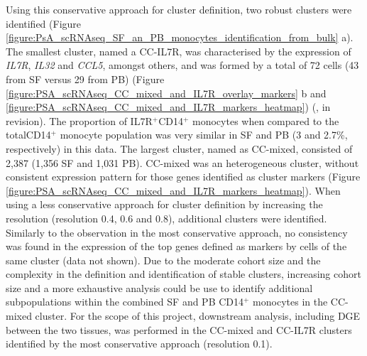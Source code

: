Using this conservative approach for cluster definition, two robust clusters were identified (Figure \ref{figure:PsA_scRNAseq_SF_an_PB_monocytes_identification_from_bulk} a). The smallest cluster, named a CC-IL7R, was characterised by the expression of \textit{IL7R}, \textit{IL32} and \textit{CCL5}, amongst others, and was formed by a total of 72 cells (43 from SF versus 29 from PB) (Figure \ref{figure:PSA_scRNAseq_CC_mixed_and_IL7R_overlay_markers} b and \ref{figure:PSA_scRNAseq_CC_mixed_and_IL7R_markers_heatmap}) (\parencite{Al-Mossawi2018}, in revision). The proportion of IL7R$^+$CD14$^+$ monocytes when compared to the totalCD14$^+$ monocyte population was very similar in SF and PB (3 and 2.7\%, respectively) in this data. The largest cluster, named as CC-mixed, consisted of 2,387 (1,356 SF and 1,031 PB). CC-mixed was an heterogeneous cluster, without consistent expression pattern for those genes identified as cluster markers (Figure \ref{figure:PSA_scRNAseq_CC_mixed_and_IL7R_markers_heatmap}). When using a less conservative approach for cluster definition by increasing the resolution (resolution 0.4, 0.6 and 0.8), additional clusters were identified. Similarly to the observation in the most conservative approach, no consistency was found in the expression of the top genes defined as markers by cells of the same cluster (data not shown). Due to the moderate cohort size and the complexity in the definition and identification of stable clusters, increasing cohort size and a more exhaustive analysis could be use to identify additional subpopulations within the combined SF and PB CD14$^+$ monocytes in the CC-mixed cluster. For the scope of this project, downstream analysis, including DGE between the two tissues, was performed in the CC-mixed and CC-IL7R clusters identified by the most conservative approach (resolution 0.1).




